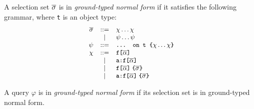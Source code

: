 \begin{definition}
A \gql selection set $\overline{\sigma}$ is in \textit{ground-typed normal form} if it satisfies the following grammar, where \texttt{t} is an object type: %
\begin{displaymath}\small
	\begin{array}{rcl}
	\overline{\sigma} & ::= & \chi \ldots \chi \\
	& | & \psi \ldots \psi\\
	\psi & ::= & \texttt{... on t \{}\chi \ldots \chi\texttt{\}}\\
	\chi & ::= & \texttt{f[}\overline{\alpha}\texttt{]} \\
	& | & \texttt{a:}\texttt{f[}\overline{\alpha}\texttt{]}\\
	& | & \texttt{f[}\overline{\alpha}\texttt{]}\; \texttt{\{}\overline{\sigma}\texttt{\}}\\
	& | & \texttt{a:}\texttt{f[}\overline{\alpha}\texttt{]}\; \texttt{\{}\overline{\sigma}\texttt{\}}	
	\end{array}
\end{displaymath}
	
	\end{definition}
\iffalse
\begin{itemize}
	\item If it is a field then its subselections are either all fields or all inline fragments
	\item If it is an inline fragment, then its type condition is an object type and its subselections are only fields, and
	\item Its subselections are in ground-typed normal form.
\end{itemize}
\end{definition}
\fi

\begin{definition}
A \gql query $\varphi$ is in \textit{ground-typed normal form} if its selection set is in ground-typed normal form.
\end{definition}

\iffalse
We formalize the latter with the following definition in Coq.
\begin{verbatim}
Definition is_a_grounded_typed_nf_query 
  (s : wfGraphQLSchema) (|$\query$| : query) :=
    are_in_ground_typed_nf s |$\query$|.(selection_set).
  \end{verbatim}
  \fi 

